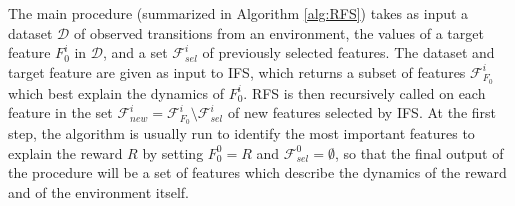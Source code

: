 The main procedure (summarized in Algorithm \ref{alg:RFS}) takes as input a 
dataset $\mathcal{D}$ of observed transitions from an environment, the values 
of a target feature $F_0^i$ in $\mathcal{D}$, and a set $\mathcal{F}_{sel}^i$ of
previously selected features. 
The dataset and target feature are given as input to IFS, which returns a subset
of features $\mathcal{F}_{F_0}^i$ which best explain the dynamics of $F_0^i$. 
RFS is then recursively called on each feature in the set 
$\mathcal{F}_{new}^i = \mathcal{F}_{F_0}^i \setminus \mathcal{F}_{sel}^i$ of new
features selected by IFS.
At the first step, the algorithm is usually run to identify the most important 
features to explain the reward $R$ by setting $F_0^0 = R$ and 
$\mathcal{F}_{sel}^0 = \emptyset$, so that the final output of the procedure 
will be a set of features which describe the dynamics of the reward and of the 
environment itself.

